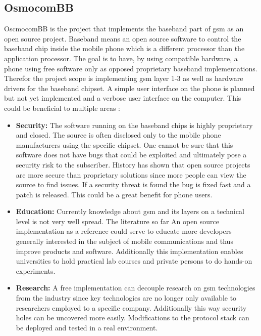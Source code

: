 \subsection{OsmocomBB}
OscmocomBB is the project that implements the baseband part of \gls{gsm} as an open source project.
Baseband means an open source software to control the baseband chip inside the mobile phone which is a different processor than the application processor.
The goal is to have, by using compatible hardware, a phone using free software only as opposed proprietary baseband implementations.
Therefor the project scope is implementing \gls{gsm} layer 1-3 as well as hardware drivers for the baseband chipset.
A simple user interface on the phone is planned but not yet implemented and a verbose user interface on the computer.
This could be beneficial to multiple areas \cite{osmo_rationale}:
\begin{itemize}
	\item \textbf{Security:} The software running on the baseband chips is highly proprietary and closed.
	The source is often disclosed only to the mobile phone manufacturers using the specific chipset.
	One cannot be sure that this software does not have bugs that could be exploited and ultimately pose a security risk to the subscriber.
	History has shown that open source projects are more secure than proprietary solutions since more people can view the source to find issues.
	If a security threat is found the bug is fixed fast and a patch is released.
	This could be a great benefit for phone users.
	\item \textbf{Education:} Currently knowledge about \gls{gsm} and its layers on a technical level is not very well spread.
	The literature so far 
	An open source implementation as a reference could serve to educate more developers generally interested in the subject of mobile communications and thus improve products and software.
	Additionally this implementation enables universities to hold practical lab courses and private persons to do hands-on experiments.
	\item \textbf{Research:} A free implementation can decouple research on \gls{gsm} technologies from the industry since key technologies are no longer only available to researchers employed to a specific company.
	Additionally this way security holes can be uncovered more easily.
	Modifications to the protocol stack can be deployed and tested in a real environment.
\end{itemize}


